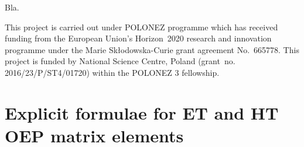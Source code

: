 Bla.

\begin{acknowledgments}
This project is carried out under POLONEZ programme which has received funding from the European Union's
Horizon~2020 research and innovation programme under the Marie Skłodowska-Curie grant agreement 
No.~665778. This project is funded by National Science Centre, Poland 
(grant~no. 2016/23/P/ST4/01720) within the POLONEZ 3 fellowship.
\end{acknowledgments}

\appendix

\section{Explicit formulae for ET and HT OEP matrix elements\label{a:gdf-formulae}}

